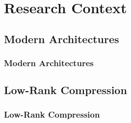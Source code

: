 \section{Research Context}

\subsection{Modern Architectures}
\begin{frame}
    \frametitle{Modern Architectures}
\end{frame}

\subsection{Low-Rank Compression}
\begin{frame}
    \frametitle{Low-Rank Compression}
\end{frame}

